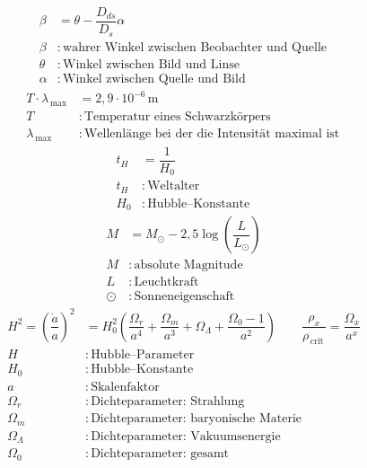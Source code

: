 \documentclass[a4paper,12pt]{article}
\numberwithin{equation}{section}
\begin{document}
\begin{align} 
        \beta &=\theta -\dfrac{D_{ds}}{D_s}\alpha \\
        \beta &:\,\text{wahrer Winkel zwischen Beobachter und Quelle}\,\nonumber \\
        \theta &:\,\text{Winkel zwischen Bild und Linse}\,\nonumber \\
        \alpha &:\,\text{Winkel zwischen Quelle und Bild}\,\nonumber 
\end{align} 
\begin{align} 
        T\cdot \lambda _{\,\text{max}\,}&=2,9\cdot 10^{-6}\,\text{m}\,\\
        T&:\,\text{Temperatur eines Schwarzkörpers}\,\nonumber \\
        \lambda _{\,\text{max}\,}&:\,\text{Wellenlänge bei der die Intensität maximal ist}\,\nonumber 
\end{align} 
\begin{align} 
        t_H&=\dfrac{1}{H_0}\\
        t_H&:\,\text{Weltalter}\,\nonumber \\
        H_0&:\,\text{Hubble--Konstante}\,\nonumber 
\end{align} 
\begin{align} 
        M&=M_\odot-2,5\log \left(\dfrac{L}{L_\odot}\right)\\
        M&:\,\text{absolute Magnitude}\,\nonumber \\
        L&:\,\text{Leuchtkraft}\,\nonumber \\
        \odot&:\,\text{Sonneneigenschaft}\,\nonumber 
\end{align} 
\begin{align} 
        H^2=\left(\dfrac{\dot{a}}{a}\right)^2&=H_0^2\left(\dfrac{\Omega _r}{a^4}+\dfrac{\Omega _m}{a^3}+\Omega _\Lambda +\dfrac{\Omega _0-1}{a^2}\right)\qquad \dfrac{\rho _x}{\rho _{\,\text{crit}\,}}=\dfrac{\Omega _x}{a^x}\\
        H&:\,\text{Hubble--Parameter}\,\nonumber \\
        H_0&:\,\text{Hubble--Konstante}\,\nonumber \\
        a&:\,\text{Skalenfaktor}\,\nonumber \\
        \Omega _r&:\,\text{Dichteparameter: Strahlung}\,\nonumber \\
        \Omega _m&:\,\text{Dichteparameter: baryonische Materie}\,\nonumber \\
        \Omega _\Lambda&:\,\text{Dichteparameter: Vakuumsenergie}\,\nonumber \\
        \Omega _0&:\,\text{Dichteparameter: gesamt}\,\nonumber 
\end{align} 
\end{document}
